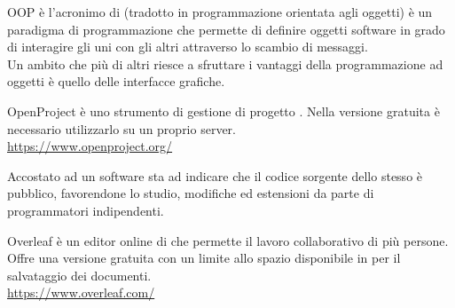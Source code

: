 
OOP è l'acronimo di  (tradotto in programmazione orientata agli oggetti) è un paradigma di programmazione che permette di definire oggetti software in grado di interagire gli uni con gli altri attraverso lo scambio di messaggi.\\
Un ambito che più di altri riesce a sfruttare i vantaggi della programmazione ad oggetti è quello delle interfacce grafiche.

OpenProject è uno strumento di gestione di progetto . Nella versione gratuita è necessario utilizzarlo su un proprio server.\\
\url{https://www.openproject.org/}

Accostato ad un software sta ad indicare che il codice sorgente dello stesso è pubblico, favorendone lo studio, modifiche ed estensioni da parte di programmatori indipendenti.

Overleaf è un editor online di  che permette il lavoro collaborativo di più persone. Offre una versione gratuita con un limite allo spazio disponibile in  per il salvataggio dei documenti.\\
\url{https://www.overleaf.com/}
\clearpage
